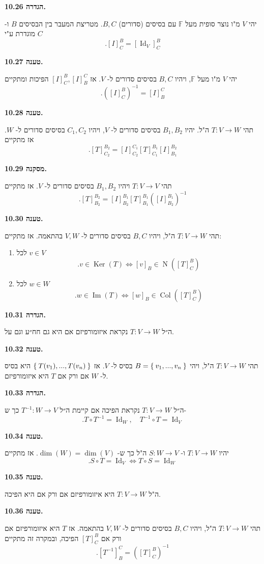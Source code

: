 \documentclass[12pt]{report}
\theoremstyle{plain}
\theoremstyle{definition}
\newcommand{\F}{\mathbb{F}}
\newcommand{\0}{\mathbf{0}}
\DeclareMathOperator{\Col}{Col}
\DeclareMathOperator{\Null}{N}
\DeclareMathOperator{\Ker}{Ker}
\DeclareMathOperator{\Image}{Im}
\DeclareMathOperator{\Id}{Id}
\begin{document}
\noindent\textbf{הגדרה 10.26.}

יהי
$V$
מ"ו נוצר סופית מעל
$\F$
עם בסיסים (סדורים)
$B,C$.
מטריצת המעבר בין הבסיסים
$B$
ו-
$C$
מוגדרת ע"י
$$
.[I]_C^B=[\Id_V]_C^B
$$
\bigskip
\bigskip

\noindent\textbf{טענה 10.27.}

יהי
$V$
מ"ו מעל
$\F$,
ויהיו
$B,C$
בסיסים סדורים ל-
$V$.
אז 
$[I]_C^B,[I]_B^C$
הפיכות ומתקיים
$$
.([I]_C^B)^{-1}=[I]_B^C
$$
\bigskip
\bigskip

\noindent\textbf{טענה 10.28.}

תהי
$T:V\to W$
ה"ל. יהיו 
$B_1,B_2$
בסיסים סדורים ל-
$V$,
ויהיו
$C_1,C_2$
בסיסים סדורים ל-
$W$. 
אז מתקיים
$$
.[T]_{C_2}^{B_2}=[I]_{C_2}^{C_1}[T]_{C_1}^{B_1}[I]_{B_1}^{B_2}
$$
\bigskip
\bigskip

\noindent\textbf{מסקנה 10.29.}

תהי
$T:V\to V$
ויהיו
$B_1,B_2$
בסיסים סדורים ל-
$V$.
אז מתקיים
$$
.[T]_{B_2}^{B_2}=[I]_{B_2}^{B_1}[T]_{B_1}^{B_1}([I]_{B_2}^{B_1})^{-1}
$$
\bigskip
\bigskip

\noindent\textbf{טענה 10.30.}

תהי
$T:V\to W$
ה"ל, ויהיו
$B,C$
בסיסים סדורים ל-
$V,W$
בהתאמה. אז מתקיים:
\begin{enumerate}[label=\alph*.]
\item 
לכל
$v\in V$
$$
.v\in\Ker(T) \iff [v]_B\in\Null([T]_C^B)
$$


\item 
לכל
$w\in W$
$$
.w\in\Image(T) \iff [w]_B\in\Col([T]_C^B)
$$


\end{enumerate}
\bigskip
\bigskip

\noindent\textbf{הגדרה 10.31.}

ה״ל
$T:V\to W$
נקראת איזומורפיזם אם היא גם חח״ע וגם על.
\bigskip
\bigskip

\noindent\textbf{טענה 10.32.}

תהי 
$T:V\to W$
ה"ל, ויהי
$B=\Set{v_1,...,v_n}$
בסיס ל-
$V$.
אז 
$\Set{T(v_1),...,T(v_n)}$
היא בסיס ל-
$W$
אם ורק אם
$T$
היא איזומורפיזם.
\bigskip
\bigskip

\noindent\textbf{הגדרה 10.33.}

ה״ל
$T:V\to W$
נקראת הפיכה אם קיימת ה״ל
$T^{-1}:W\to V$
כך ש-
$$
.T\circ T^{-1}=\Id_W,\quad T^{-1}\circ T=\Id_V
$$
\bigskip
\bigskip

\noindent\textbf{טענה 10.34.}

יהיו
$T:V\to W$
ו-
$S:W\to V$
ה"ל כך ש-
$\dim(W)=\dim(V)$.
אז מתקיים
$$
.S\circ T=\Id_V \iff T\circ S=\Id_W
$$
\bigskip
\bigskip

\noindent\textbf{טענה 10.35.}

ה"ל
$T:V\to W$
היא איזומורפיזם אם ורק אם היא הפיכה.
\bigskip
\bigskip

\noindent\textbf{טענה 10.36.}

תהי
$T:V\to W$
ה"ל, ויהיו
$B,C$
בסיסים סדורים ל-
$V,W$
בהתאמה. אז 
$T$
היא איזומורפיזם אם ורק אם
$[T]_C^B$
הפיכה, ובמקרה זה מתקיים
$$
.[T^{-1}]_B^C=([T]_C^B)^{-1}
$$
\bigskip
\bigskip
\end{document}

